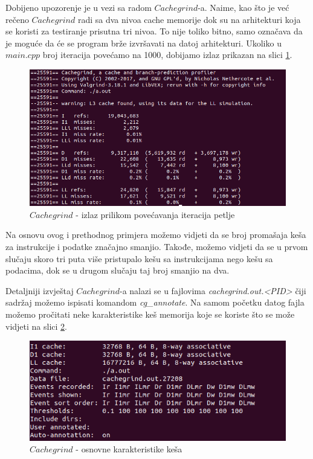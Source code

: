 \documentclass[a4paper]{article}
\begin{document}
Dobijeno upozorenje je u vezi sa radom $Cachegrind$-a. Naime, kao što je već rečeno $Cachegrind$ radi sa dva nivoa cache memorije dok su na arhitekturi koja se koristi za testiranje prisutna tri nivoa. To nije toliko bitno, samo označava da je moguće da će se program brže izvršavati na datoj arhitekturi.
Ukoliko u $main.cpp$ broj iteracija povećamo na 1000, dobijamo izlaz prikazan na slici \ref{fig:cache2}.
	\begin{figure}[h!]
		\caption{$Cachegrind$ - izlaz prilikom povećavanja iteracija petlje}
		\label{fig:cache2}
		\includegraphics[scale=0.5]{../Valgrind/Cachegrind/cache2.png}
	\end{figure}

Na osnovu ovog i prethodnog primjera možemo vidjeti da se broj promašaja keša za instrukcije i podatke značajno smanjio. Takođe, možemo vidjeti da se u prvom slučaju skoro tri puta više pristupalo kešu sa instrukcijama nego kešu sa podacima, dok se u drugom slučaju taj broj smanjio na dva. 

Detaljniji izvještaj $Cachegrind$-a nalazi se u fajlovima \textit{cachegrind.out.<PID>} čiji sadržaj možemo ispisati komandom \textit{cg\_annotate}. Na samom početku datog fajla možemo pročitati neke karakteristike keš memorija koje se koriste što se može vidjeti na slici \ref{fig:cache3}.
	\begin{figure}[h!]
		\centering
		\caption{$Cachegrind$ - osnovne karakteristike keša}
		\label{fig:cache3}
		\includegraphics[scale=0.5]{../Valgrind/Cachegrind/cache3.png}
	\end{figure}
\end{document}
